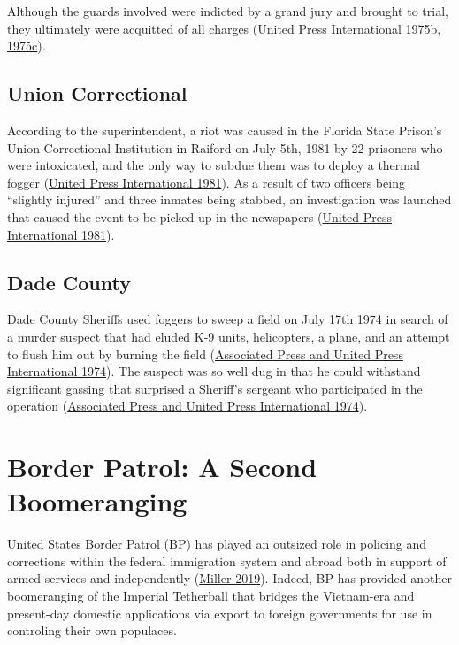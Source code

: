 \documentclass[
  11pt,
]{krantz}
\begin{document}
Although the guards involved were indicted by a grand jury and brought to trial, they ultimately were acquitted of all charges (\protect\hyperlink{ref-UPI1975a}{United Press International 1975b}, \protect\hyperlink{ref-UPI1975b}{1975c}).

\hypertarget{union-correctional}{%
\section{Union Correctional}\label{union-correctional}}

According to the superintendent, a riot was caused in the Florida State Prison's Union Correctional Institution in Raiford on July 5th, 1981 by 22 prisoners who were intoxicated, and the only way to subdue them was to deploy a thermal fogger (\protect\hyperlink{ref-TallahasseeDemocrat1981_07_07}{United Press International 1981}).
As a result of two officers being ``slightly injured'' and three inmates being stabbed, an investigation was launched that caused the event to be picked up in the newspapers (\protect\hyperlink{ref-TallahasseeDemocrat1981_07_07}{United Press International 1981}).

\hypertarget{dade-county}{%
\section{Dade County}\label{dade-county}}

Dade County Sheriffs used foggers to sweep a field on July 17th 1974 in search of a murder suspect that had eluded K-9 units, helicopters, a plane, and an attempt to flush him out by burning the field (\protect\hyperlink{ref-TampaBayTimes1974_07_18}{Associated Press and United Press International 1974}).
The suspect was so well dug in that he could withstand significant gassing that surprised a Sheriff's sergeant who participated in the operation (\protect\hyperlink{ref-TampaBayTimes1974_07_18}{Associated Press and United Press International 1974}).

\hypertarget{CBP}{%
\chapter{Border Patrol: A Second Boomeranging}\label{CBP}}

United States Border Patrol (BP) has played an outsized role in policing and corrections within the federal immigration system and abroad both in support of armed services and independently (\protect\hyperlink{ref-Miller2019}{Miller 2019}).
Indeed, BP has provided another boomeranging of the Imperial Tetherball that bridges the Vietnam-era and present-day domestic applications via export to foreign governments for use in controling their own populaces.
\end{document}
